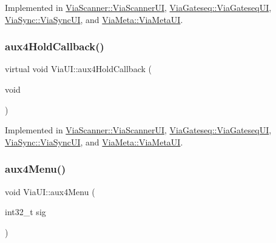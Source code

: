Implemented in \mbox{\hyperlink{class_via_scanner_1_1_via_scanner_u_i_a34c593dfd035906c09a2cde0024fd48f}{Via\+Scanner\+::\+Via\+Scanner\+UI}}, \mbox{\hyperlink{class_via_gateseq_1_1_via_gateseq_u_i_a78f330f4c02acb69f9c2321a8187f8dc}{Via\+Gateseq\+::\+Via\+Gateseq\+UI}}, \mbox{\hyperlink{class_via_sync_1_1_via_sync_u_i_ab74dfab193404bd23e90ba1b44a0a743}{Via\+Sync\+::\+Via\+Sync\+UI}}, and \mbox{\hyperlink{class_via_meta_1_1_via_meta_u_i_aa6309c2403a8436cc3ec222f7914b202}{Via\+Meta\+::\+Via\+Meta\+UI}}.

\mbox{\label{class_via_u_i_a884790ab6dac8e6f49104146ff620512}} 
\subsubsection{\texorpdfstring{aux4\+Hold\+Callback()}{aux4HoldCallback()}}
{\footnotesize\ttfamily virtual void Via\+U\+I\+::aux4\+Hold\+Callback (\begin{DoxyParamCaption}\item[{void}]{ }\end{DoxyParamCaption})\hspace{0.3cm}{\ttfamily [pure virtual]}}



Implemented in \mbox{\hyperlink{class_via_scanner_1_1_via_scanner_u_i_af994cf63aa7becc41c9e3dcb2e08d8c2}{Via\+Scanner\+::\+Via\+Scanner\+UI}}, \mbox{\hyperlink{class_via_gateseq_1_1_via_gateseq_u_i_a98c59b4566672aeb522f6cafccd46b72}{Via\+Gateseq\+::\+Via\+Gateseq\+UI}}, \mbox{\hyperlink{class_via_sync_1_1_via_sync_u_i_a15f48c7e1d5f77292ee46d997421cd4e}{Via\+Sync\+::\+Via\+Sync\+UI}}, and \mbox{\hyperlink{class_via_meta_1_1_via_meta_u_i_a2a1cfb3452d150af61f61716aa94f782}{Via\+Meta\+::\+Via\+Meta\+UI}}.

\mbox{\label{class_via_u_i_a9e082c0b454b4fe05a9fc48ca922f9b5}} 
\subsubsection{\texorpdfstring{aux4\+Menu()}{aux4Menu()}}
{\footnotesize\ttfamily void Via\+U\+I\+::aux4\+Menu (\begin{DoxyParamCaption}\item[{int32\+\_\+t}]{sig }\end{DoxyParamCaption})}

